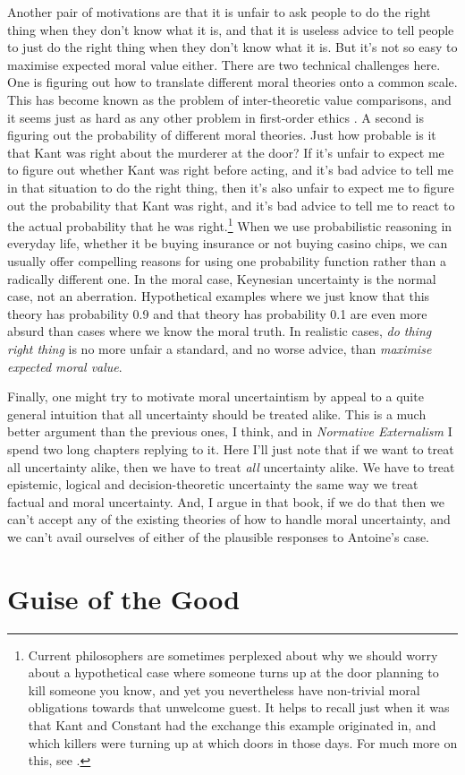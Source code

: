 \documentclass[11pt,]{book}
\let\rmarkdownfootnote\footnote%
\def\footnote{\protect\rmarkdownfootnote}
\begin{document}
Another pair of motivations are that it is unfair to ask people to do the right thing when they don't know what it is, and that it is useless advice to tell people to just do the right thing when they don't know what it is. But it's not so easy to maximise expected moral value either. There are two technical challenges here. One is figuring out how to translate different moral theories onto a common scale. This has become known as the problem of inter-theoretic value comparisons, and it seems just as hard as any other problem in first-order ethics \citep{Hedden2015}. A second is figuring out the probability of different moral theories. Just how probable is it that Kant was right about the murderer at the door? If it's unfair to expect me to figure out whether Kant was right before acting, and it's bad advice to tell me in that situation to do the right thing, then it's also unfair to expect me to figure out the probability that Kant was right, and it's bad advice to tell me to react to the actual probability that he was right.\footnote{Current philosophers are sometimes perplexed about why we should worry about a hypothetical case where someone turns up at the door planning to kill someone you know, and yet you nevertheless have non-trivial moral obligations towards that unwelcome guest. It helps to recall just when it was that Kant and Constant had the exchange this example originated in, and which killers were turning up at which doors in those days. For much more on this, see \citet{Rousselire2018}.} When we use probabilistic reasoning in everyday life, whether it be buying insurance or not buying casino chips, we can usually offer compelling reasons for using one probability function rather than a radically different one. In the moral case, Keynesian uncertainty is the normal case, not an aberration. Hypothetical examples where we just know that this theory has probability 0.9 and that theory has probability 0.1 are even more absurd than cases where we know the moral truth. In realistic cases, \emph{do thing right thing} is no more unfair a standard, and no worse advice, than \emph{maximise expected moral value}.

Finally, one might try to motivate moral uncertaintism by appeal to a quite general intuition that all uncertainty should be treated alike. This is a much better argument than the previous ones, I think, and in \emph{Normative Externalism} I spend two long chapters replying to it. Here I'll just note that if we want to treat all uncertainty alike, then we have to treat \emph{all} uncertainty alike. We have to treat epistemic, logical and decision-theoretic uncertainty the same way we treat factual and moral uncertainty. And, I argue in that book, if we do that then we can't accept any of the existing theories of how to handle moral uncertainty, and we can't avail ourselves of either of the plausible responses to Antoine's case.

\hypertarget{guise-of-the-good}{%
\section{Guise of the Good}\label{guise-of-the-good}}


\end{document}
